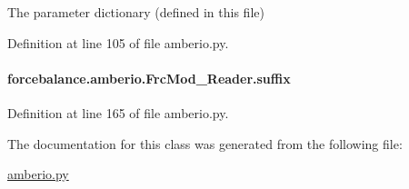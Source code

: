The parameter dictionary (defined in this file) 



Definition at line 105 of file amberio.\-py.

\hypertarget{classforcebalance_1_1amberio_1_1FrcMod__Reader_a4757a1ec953e5be7f8593071e0698731}{
\paragraph[{suffix}]{\setlength{\rightskip}{0pt plus 5cm}forcebalance.\-amberio.\-Frc\-Mod\-\_\-\-Reader.\-suffix}}\label{classforcebalance_1_1amberio_1_1FrcMod__Reader_a4757a1ec953e5be7f8593071e0698731}


Definition at line 165 of file amberio.\-py.



The documentation for this class was generated from the following file\-:\begin{DoxyCompactItemize}
\item 
\hyperlink{amberio_8py}{amberio.\-py}\end{DoxyCompactItemize}
